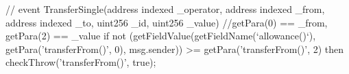 
// event TransferSingle(address indexed _operator, address indexed _from, address indexed _to, uint256 _id, uint256 _value) 
//getPara(0) == _from, getPara(2) == _value
if not (getFieldValue(getFieldName(`allowance()`), getPara('transferFrom()', 0), msg.sender)) >= getPara('transferFrom()', 2)
then 
  checkThrow('transferFrom()', true);